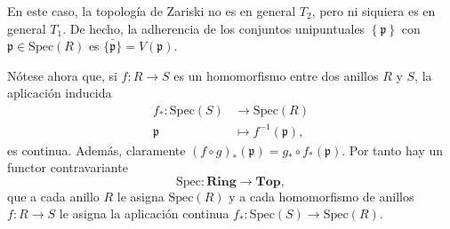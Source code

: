 \documentclass[12pt,a4paper]{article}
\theoremstyle{definition} \newtheorem{defn}[thm]{Definición}
\theoremstyle{definition} \newtheorem{ejemplo}[thm]{Ejemplo}
\theoremstyle{definition} \newtheorem{ejercicio}[thm]{Ejercicio}
\theoremstyle{remark} \newtheorem*{obs}{Observación}
\def\sp{\mathrm{Spec}}
\def\pp{\mathfrak{p}}
\begin{document}
      En este caso, la topología de Zariski no es en general $T_2$, pero ni siquiera es en general $T_1$. De hecho, la adherencia de los conjuntos unipuntuales $\left\{ \pp \right\}$ con $\pp \in \sp(R)$ es $\bar{\{\pp\}}=V(\pp)$.

      Nótese ahora que, si $f:R\rightarrow S$ es un homomorfismo entre dos anillos $R$ y $S$, la aplicación inducida
      \begin{align*}
	f_* :\sp(S)&\longrightarrow \sp(R)\\ 
	\pp &\longmapsto f^{-1}(\pp), 
	\end{align*}
	es continua. Además, claramente $(f\circ g)_*(\pp)=g_*\circ f_*(\pp)$. Por tanto hay un functor contravariante
	\begin{equation*}
	  \sp: \mathbf{Ring} \longrightarrow \mathbf{Top},
	\end{equation*}
	que a cada anillo $R$ le asigna $\sp(R)$ y a cada homomorfismo de anillos $f:R\rightarrow S$ le asigna la aplicación continua $f_*:\sp(S)\rightarrow \sp(R)$.

      
\end{document}
